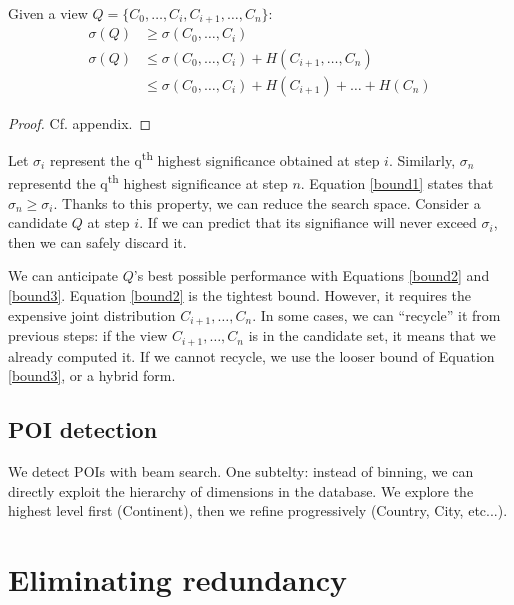 \begin{lemma}
\label{lem:bounds}
Given a view $Q = \{C_0, \ldots , C_i, C_{i+1}, \ldots, C_n\}$:
\begin{align}
    \sigma(Q)  & \geq \sigma(C_0, \ldots , C_i) \label{bound1}\\
     \sigma(Q) & \leq \sigma(C_0, \ldots , C_i) + H(C_{i+1}, \ldots, C_n) \label{bound2}\\
               & \leq \sigma(C_0, \ldots , C_i) + H(C_{i+1}) + \ldots + H(C_n) \label{bound3}
\end{align}
\end{lemma}

\begin{proof}
Cf. appendix.
\end{proof}

Let $\sigma_i$ represent the q\textsuperscript{th} highest significance
obtained at step $i$. Similarly, $\sigma_n$ representd the
q\textsuperscript{th} highest significance at step $n$. Equation \ref{bound1}
states that $\sigma_n \geq \sigma_i$. Thanks to this property, we can reduce
the search space. Consider a candidate $Q$ at step $i$. If we can predict that its
signifiance will never exceed $\sigma_i$, then we can safely discard it.

We can anticipate $Q$'s best possible performance with Equations \ref{bound2}
and \ref{bound3}. Equation \ref{bound2} is the tightest bound. However, it
requires the expensive joint distribution $C_{i+1}, \ldots, C_n$.  In some
cases, we can ``recycle'' it from previous steps: if the view $C_{i+1}, \ldots
,C_n$ is in the candidate set, it means that we already computed it.
If we cannot recycle, we use the looser bound of Equation
\ref{bound3}, or a hybrid form.



\subsection{POI detection}

We detect POIs with beam search.  One subtelty: instead of binning,
we can directly exploit the hierarchy of dimensions in the
database. We explore the highest level first (Continent), then we refine
progressively (Country, City, etc...).


\section{Eliminating redundancy}

